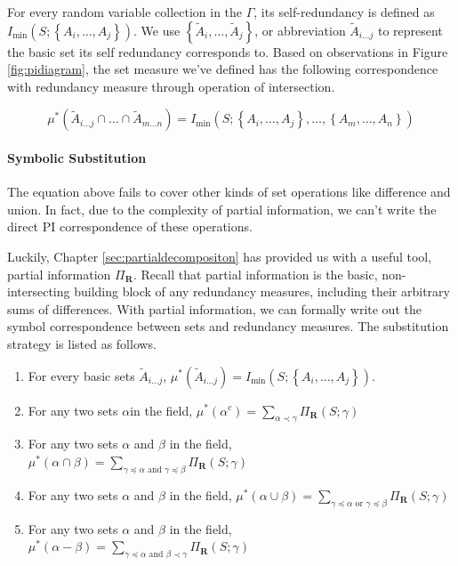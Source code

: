 For every random variable collection in the $\Gamma$, its self-redundancy is defined as $I_{\min}\left(S;\left\{A_i, \ldots, A_j\right\}\right)$. We use $\left\{ \tilde{A}_{i}, \ldots, \tilde{A}_{j} \right\}$, or abbreviation $\tilde{A}_{i\ldots j}$ to represent the basic set its self redundancy corresponds to. Based on observations in Figure \ref{fig:pidiagram}, the set measure we've defined has the following correspondence with redundancy measure through operation of intersection.

\begin{equation}
    \mu^{*}\left(\tilde{A}_{i \ldots j} \cap \ldots \cap \tilde{A}_{m \ldots n} \right) = I_{\min}\left(S; \left\{{A}_i,\ldots,{A}_j \right\}, \ldots,  \left\{{A}_m,\ldots,{A}_n \right\}\right)
    \label{eqn:intersectofbasic}
\end{equation}







\paragraph{Symbolic Substitution}
The equation above fails to cover other kinds of set operations like difference and union. In fact, due to the complexity of partial information, we can't write the direct PI correspondence of these operations.

Luckily, Chapter \ref{sec:partialdecompositon}  has provided us with a useful tool, partial information $\Pi_{\mathbf{R}}$. Recall that partial information is the basic, non-intersecting building block of any redundancy measures, including their arbitrary sums of differences. With partial information, we can formally write out the symbol correspondence between sets and redundancy measures. The substitution strategy is listed as follows.

\begin{enumerate}
    \item For every basic sets $\tilde{A}_{i\ldots j}$, $\mu^{*} \left(\tilde{A}_{i\ldots j}\right) = I_{\min}\left(S;\left\{A_i, \ldots, A_j\right\}\right)$.
    \item For any two sets $\alpha$in the field, $\mu^{*} \left(\alpha^{c} \right) = \sum_{ \alpha \prec \gamma  } \Pi_{\mathbf{R}} (S;\gamma)$
    \item For any two sets $\alpha$ and $\beta$ in the field, $\mu^{*} \left(\alpha \cap \beta \right) = \sum_{\gamma \preceq \alpha \text{ and } \gamma \preceq \beta} \Pi_{\mathbf{R}} (S;\gamma)$
    \item For any two sets $\alpha$ and $\beta$ in the field, $\mu^{*} \left(\alpha \cup \beta \right) = \sum_{\gamma \preceq \alpha \text{ or } \gamma \preceq \beta} \Pi_{\mathbf{R}} (S;\gamma)$
    \item For any two sets $\alpha$ and $\beta$ in the field, $\mu^{*} \left(\alpha - \beta \right) = \sum_{\gamma \preceq \alpha \text{ and } \beta \prec \gamma} \Pi_{\mathbf{R}} (S;\gamma)$
\end{enumerate}

